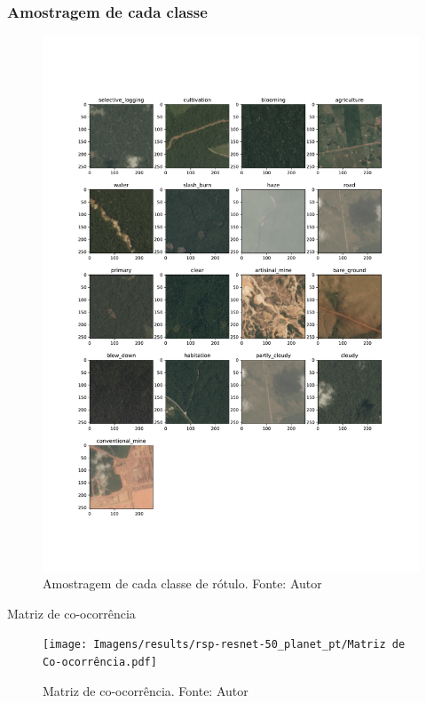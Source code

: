 \documentclass{beamer}
\begin{document}
\begin{frame}
\frametitle{Amostragem de cada classe}

    \begin{figure}[!ht]
        \centering
        \includegraphics[width=\columnwidth]{Imagens/results/rsp-resnet-50_planet_pt/Amostras de cada classe.pdf}
        \caption{Amostragem de cada classe de rótulo.
        Fonte: Autor}
       \label{fig:classes}
    \end{figure}
        
\end{frame}
    

\begin{frame}{Matriz de co-ocorrência}
    \begin{figure}[!ht]
        \centering
        \texttt{[image: Imagens/results/rsp-resnet-50\_planet\_pt/Matriz de Co-ocorrência.pdf]}
        \caption{Matriz de co-ocorrência.
        Fonte: Autor}
       \label{fig:coocorrencia}
    \end{figure}    
\end{frame}
\end{document}

